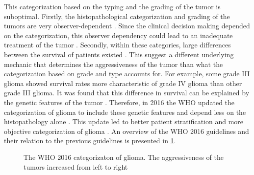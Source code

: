 This categorization based on the typing and the grading of the \gls{tumor} is suboptimal.
Firstly, the histopathological categorization and grading of the \glspl{tumor} are very observer-dependent \autocite{mittler1996gradingreliability, vandenbent2010interobserver}.
Since the clinical decision making depended on the categorization, this observer dependency could lead to an inadequate treatment of the \gls{tumor} \autocite{vandenbent2010interobserver}.
Secondly, within these categories, large differences between the survival of patients existed  \autocite{dubbink2015molecular}.
This suggest a different underlying mechanic that determines the aggressiveness of the \gls{tumor} than what the categorization based on grade and type accounts for.
For example, some grade III \gls{glioma} showed survival rates more characteristic of grade IV \gls{glioma} than other grade III \gls{glioma}.
It was found that this difference in survival can be explained by the genetic features of the \gls{tumor} \autocite{dubbink2015molecular,eckel2015gliomagroups}.
Therefore, in 2016 the \gls{WHO} updated the categorization of \gls{glioma} to include these genetic features and depend less on the histopathology alone \cite{louis20162016}.
This update led to better patient stratification and more objective categorization of \gls{glioma} \autocite{molinaro2019geneticepidemiology}.
An overview of the \gls{WHO} 2016 guidelines and their relation to the previous guidelines is presented in \cref{fig:intro_glioma_categorization}.

\begin{figure}[hbt]
    \centering
    \caption{The \acrfull{WHO} 2016 categorizaton of glioma. The aggressiveness of the \glspl{tumor} increased from left to right}\label{fig:intro_glioma_categorization}
\end{figure}

